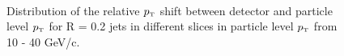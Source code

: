\documentclass[ALICE]{ALICE_analysis_notes}
\newcommand{\pT}{$p_{\mbox{\tiny T}}$\xspace}
\begin{document}
\begin{appendix}
\begin{figure}[h!]
    \qquad
    \\
    \qquad
    \caption{Distribution of the relative \pT shift between detector and particle level \pT for R = 0.2 jets in different slices in particle level \pT from 10 - 40 GeV/c.}
    \label{fig:EnergyScaleSlices1}
\end{figure}

\newpage


\end{appendix}
\end{document}
